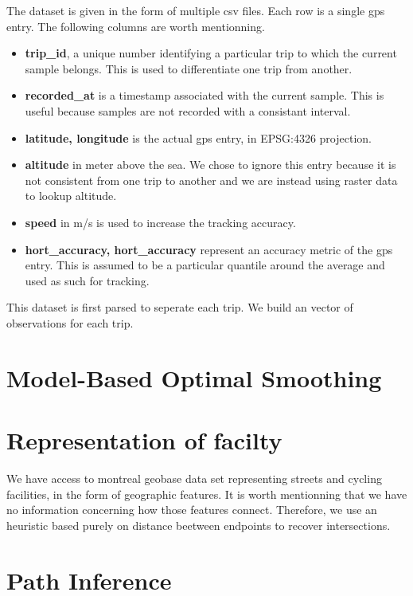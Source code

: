 \documentclass{article}
\begin{document}
The dataset is given in the form of multiple csv files. Each row is a single \gls{gps} entry. The following columns are worth mentionning.
\begin{itemize}
  \item \textbf{trip\_id}, a unique number identifying a particular trip to which the current sample belongs. This is used to differentiate one trip from another. 
  \item \textbf{recorded\_at} is a timestamp associated with the current sample. This is useful because samples are not recorded with a consistant interval.
  \item \textbf{latitude, longitude} is the actual \gls{gps} entry, in EPSG:4326 projection.
  \item \textbf{altitude} in meter above the sea. We chose to ignore this entry because it is not consistent from one trip to another and we are instead using raster data to lookup altitude.
  \item \textbf{speed} in m/s is used to increase the tracking accuracy.
  \item \textbf{hort\_accuracy, hort\_accuracy} represent an accuracy metric of the gps entry. This is assumed to be a particular quantile around the average and used as such for tracking.
\end{itemize}

This dataset is first parsed to seperate each trip. We build an vector of observations for each trip.

\section{Model-Based Optimal Smoothing}\label{Sec:Smoothing}



\section{Representation of facilty}\label{Sec:Facility}

We have access to montreal geobase data set representing streets and cycling facilities, in the form of geographic features. It is worth mentionning that we have no information concerning how those features connect. Therefore, we use an heuristic based purely on distance beetween endpoints to recover intersections.

\section{Path Inference}\label{Sec:Mapmatch}
\end{document}
